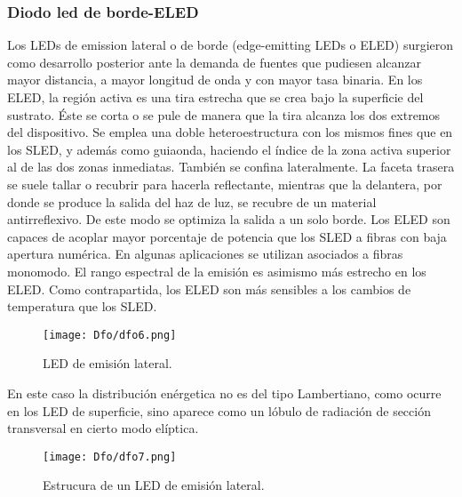 \documentclass[
	12pt, %
	fleqn, %
	a4paper, %
	oneside, %
]{LegrandOrangeBook}
\begin{document}
\subsubsection{Diodo led de borde-ELED}
Los LEDs de emission lateral o de borde (edge-emitting LEDs o ELED) surgieron como desarrollo posterior ante la demanda de fuentes que pudiesen alcanzar mayor distancia, a mayor longitud de onda y con mayor tasa binaria. En los ELED, la región activa es una tira estrecha que se crea bajo la superficie del sustrato. Éste se corta o se pule de manera que la tira alcanza los dos extremos del dispositivo. Se emplea una doble heteroestructura con los mismos fines que en los SLED, y además como
guiaonda, haciendo el índice de la zona activa superior al de las dos zonas inmediatas. También se confina lateralmente. La faceta trasera se suele tallar o recubrir para hacerla reflectante, mientras que la delantera, por donde se produce la salida del haz de luz, se recubre de un material antirreflexivo. De este modo se optimiza la salida a un solo borde.
Los ELED son capaces de acoplar mayor porcentaje de potencia que los SLED a fibras con baja apertura numérica. En algunas aplicaciones se utilizan asociados a fibras monomodo. El rango espectral de la emisión es asimismo más estrecho en los ELED. Como contrapartida, los ELED son más sensibles a los cambios de temperatura que los SLED.
\begin{figure}[H]
\centering
\texttt{[image: Dfo/dfo6.png]}
\caption{LED de emisión lateral.}
\end{figure}
En este caso la distribución enérgetica no es del tipo Lambertiano, como ocurre en los LED de superficie, sino aparece como un lóbulo de radiación de sección transversal en cierto modo elíptica.
\begin{figure}[H]
\centering
\texttt{[image: Dfo/dfo7.png]}
\caption{Estrucura de un LED de emisión lateral.}
\end{figure}
\end{document}
